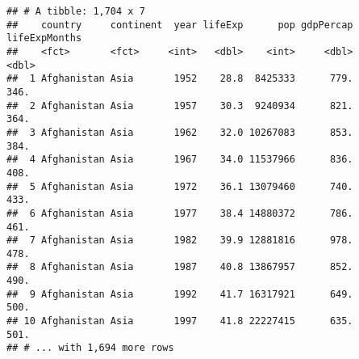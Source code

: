 \documentclass[
]{article}
\newenvironment{Shaded}{\begin{snugshade}}{\end{snugshade}}
\newcommand{\CommentTok}[1]{\textcolor[rgb]{0.56,0.35,0.01}{\textit{#1}}}
\newcommand{\DataTypeTok}[1]{\textcolor[rgb]{0.13,0.29,0.53}{#1}}
\newcommand{\DecValTok}[1]{\textcolor[rgb]{0.00,0.00,0.81}{#1}}
\newcommand{\KeywordTok}[1]{\textcolor[rgb]{0.13,0.29,0.53}{\textbf{#1}}}
\newcommand{\NormalTok}[1]{#1}
\newcommand{\OperatorTok}[1]{\textcolor[rgb]{0.81,0.36,0.00}{\textbf{#1}}}
\newcommand{\StringTok}[1]{\textcolor[rgb]{0.31,0.60,0.02}{#1}}
\begin{document}
\begin{Shaded}
\end{Shaded}

\begin{verbatim}
## # A tibble: 1,704 x 7
##    country     continent  year lifeExp      pop gdpPercap lifeExpMonths
##    <fct>       <fct>     <int>   <dbl>    <int>     <dbl>         <dbl>
##  1 Afghanistan Asia       1952    28.8  8425333      779.          346.
##  2 Afghanistan Asia       1957    30.3  9240934      821.          364.
##  3 Afghanistan Asia       1962    32.0 10267083      853.          384.
##  4 Afghanistan Asia       1967    34.0 11537966      836.          408.
##  5 Afghanistan Asia       1972    36.1 13079460      740.          433.
##  6 Afghanistan Asia       1977    38.4 14880372      786.          461.
##  7 Afghanistan Asia       1982    39.9 12881816      978.          478.
##  8 Afghanistan Asia       1987    40.8 13867957      852.          490.
##  9 Afghanistan Asia       1992    41.7 16317921      649.          500.
## 10 Afghanistan Asia       1997    41.8 22227415      635.          501.
## # ... with 1,694 more rows
\end{verbatim}

\begin{Shaded}
\end{Shaded}
\end{document}
